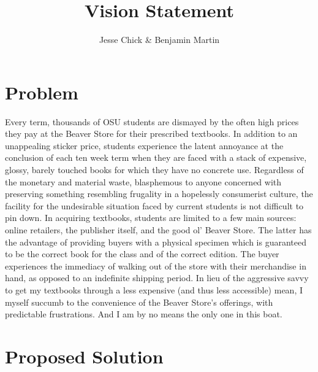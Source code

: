 \documentclass[12pt]{article}
\title{Vision Statement}
\author{Jesse Chick & Benjamin Martin}
\begin{document}
\maketitle
\tableofcontents



\section{Problem}
Every term, thousands of OSU students are dismayed by the often high prices they pay at the Beaver Store for their prescribed textbooks. In addition to an unappealing sticker price, students experience the latent annoyance at the conclusion of each ten week term when they are faced with a stack of expensive, glossy, barely touched books for which they have no concrete use. 
Regardless of the monetary and material waste, blasphemous to anyone concerned with preserving something resembling frugality in a hopelessly consumerist culture, the facility for the undesirable situation faced by current students is not difficult to pin down. In acquiring textbooks, students are limited to a few main sources: online retailers, the publisher itself, and the good ol’ Beaver Store. The latter has the advantage of providing buyers with a physical specimen which is guaranteed to be the correct book for the class and of the correct edition. The buyer experiences the immediacy of walking out of the store with their merchandise in hand, as opposed to an indefinite shipping period. In lieu of the aggressive savvy to get my textbooks through a less expensive (and thus less accessible) mean, I myself succumb to the convenience of the Beaver Store’s offerings, with predictable frustrations. And I am by no means the only one in this boat.



\section{Proposed Solution}
\end{document}
